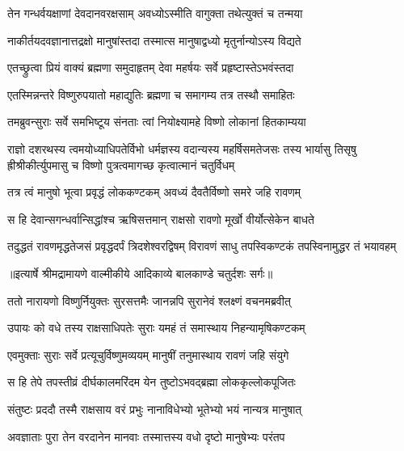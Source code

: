 \twolineshloka
{तेन गन्धर्वयक्षाणां देवदानवरक्षसाम्}
{अवध्योऽस्मीति वागुक्ता तथेत्युक्तं च तन्मया} %

\twolineshloka
{नाकीर्तयदवज्ञानात्तद्रक्षो मानुषांस्तदा}
{तस्मात्स मानुषाद्वध्यो मृतुर्नान्योऽस्य विद्यते} %

\twolineshloka
{एतच्छ्रुत्वा प्रियं वाक्यं ब्रह्मणा समुदाहृतम्}
{देवा महर्षयः सर्वे प्रहृष्टास्तेऽभवंस्तदा} %

\twolineshloka
{एतस्मिन्नन्तरे विष्णुरुपयातो महाद्युतिः}
{ब्रह्मणा च समागम्य तत्र तस्थौ समाहितः} %

\twolineshloka
{तमब्रुवन्सुराः सर्वे समभिष्टूय संनताः}
{त्वां नियोक्ष्यामहे विष्णो लोकानां हितकाम्यया} %

\fourlineshloka
{राज्ञो दशरथस्य त्वमयोध्याधिपतेर्विभो}
{धर्मज्ञस्य वदान्यस्य महर्षिसमतेजसः}
{तस्य भार्यासु तिसृषु ह्रीश्रीकीर्त्युपमासु च}
{विष्णो पुत्रत्वमागच्छ कृत्वात्मानं चतुर्विधम्} %

\twolineshloka
{तत्र त्वं मानुषो भूत्वा प्रवृद्धं लोककण्टकम्}
{अवध्यं दैवतैर्विष्णो समरे जहि रावणम्} %

\twolineshloka
{स हि देवान्सगन्धर्वान्सिद्धांश्च ऋषिसत्तमान्}
{राक्षसो रावणो मूर्खो वीर्योत्सेकेन बाधते} %

\fourlineindentedshloka
{तदुद्धतं रावणमृद्धतेजसं}
{ प्रवृद्धदर्पं त्रिदशेश्वरद्विषम्}
{विरावणं साधु तपस्विकण्टकं}
{ तपस्विनामुद्धर तं भयावहम्} %


{॥इत्यार्षे श्रीमद्रामायणे वाल्मीकीये आदिकाव्ये बालकाण्डे चतुर्दशः सर्गः॥}


\twolineshloka
{ततो नारायणो विष्णुर्नियुक्तः सुरसत्तमैः}
{जानन्नपि सुरानेवं श्लक्ष्णं वचनमब्रवीत्} %

\twolineshloka
{उपायः को वधे तस्य राक्षसाधिपतेः सुराः}
{यमहं तं समास्थाय निहन्यामृषिकण्टकम्} %

\twolineshloka
{एवमुक्ताः सुराः सर्वे प्रत्यूचुर्विष्णुमव्ययम्}
{मानुषीं तनुमास्थाय रावणं जहि संयुगे} %

\twolineshloka
{स हि तेपे तपस्तीव्रं दीर्घकालमरिंदम}
{येन तुष्टोऽभवद्ब्रह्मा लोककृल्लोकपूजितः} %

\twolineshloka
{संतुष्टः प्रददौ तस्मै राक्षसाय वरं प्रभुः}
{नानाविधेभ्यो भूतेभ्यो भयं नान्यत्र मानुषात्} %

\twolineshloka
{अवज्ञाताः पुरा तेन वरदानेन मानवाः}
{तस्मात्तस्य वधो दृष्टो मानुषेभ्यः परंतप} %

